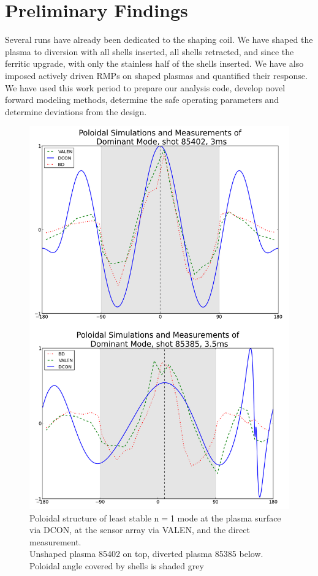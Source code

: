 \documentclass[aps,preprint,showpacs,superscriptaddress,groupedaddress]{revtex4}  %
\begin{document}
\section{Preliminary Findings}
	Several runs have already been dedicated to the shaping coil.  We have shaped the plasma to diversion with all shells inserted, all shells retracted, and since the ferritic upgrade, with only the stainless half of the shells inserted.  We have also imposed actively driven RMPs on shaped plasmas and quantified their response.  We have used this work period to prepare our analysis code, develop novel forward modeling methods, determine the safe operating parameters and determine deviations from the design. \par 
\begin{figure}[b]
	\centering
\includegraphics[scale=.3]{../Plots/DCON_VALEN_BD_comp_sh_unsh.png}\caption{Poloidal structure of least stable n$=$1 mode at the plasma surface via DCON, at the sensor array via VALEN, and the direct measurement.\\  Unshaped plasma 85402 on top, diverted plasma 85385 below.  Poloidal angle covered by shells is shaded grey}
	\label{nat_mode_sim_v_meas}
	\end{figure}
\end{document}
